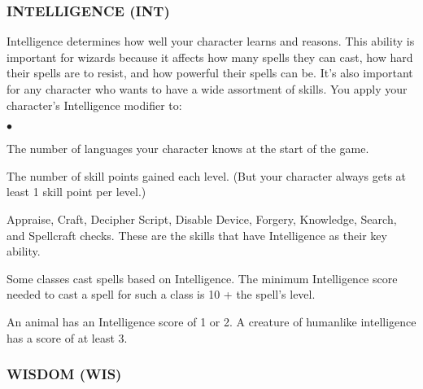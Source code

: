 \subsubsection{INTELLIGENCE (INT)}

Intelligence determines how well your character learns and reasons. This ability is important for wizards because it affects how many spells they can cast, how hard their spells are to resist, and how powerful their spells can be. It's also important for any character who wants to have a wide assortment of skills.
You apply your character's Intelligence modifier to:
\begin{list}{$\bullet$}{\itemspace}
	\item The number of languages your character knows at the start of the game.
	\item The number of skill points gained each level. (But your character always gets at least 1 skill point per level.)
	\item Appraise, Craft, Decipher Script, Disable Device, Forgery, Knowledge, Search, and Spellcraft checks. These are the skills that have Intelligence as their key ability.
	\item Some classes cast spells based on Intelligence.  The minimum Intelligence score needed to cast a spell for such a class is 10 + the spell's level.
	\item An animal has an Intelligence score of 1 or 2. A creature of humanlike intelligence has a score of at least 3.
\end{list}


\subsubsection{WISDOM (WIS)}


